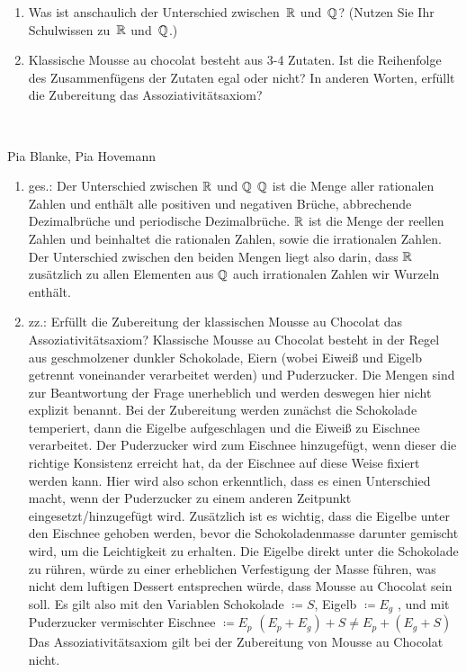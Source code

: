 \bigskip


\begin{aufg}[4 Punkte]
\begin{enumerate}[label=$\mathrm{(\roman*)}$, ref=$\mathrm{\roman*}$]
\item Was ist anschaulich der Unterschied zwischen~$\mathbb{R}$ und~$\mathbb{Q}$? (Nutzen Sie Ihr Schulwissen zu~$\mathbb{R}$ und~$\mathbb{Q}$.)
\item Klassische Mousse au chocolat besteht aus 3-4 Zutaten. Ist die Reihenfolge des Zusammenf\"ugens der Zutaten egal oder nicht? In anderen Worten, erf\"ullt die Zubereitung das Assoziativit\"atsaxiom?
\end{enumerate}
\end{aufg}
 
\bigskip

\begin{lsg}\mbox{ }
\item [Pia Blanke, Pia Hovemann]
\begin{enumerate}[label=$\mathrm{(\roman*)}$, ref=$\mathrm{\roman*}$]
\item ges.: Der Unterschied zwischen $\mathbb{R}$ und $\mathbb{Q}$ 
$\mathbb{Q}$  ist die Menge aller rationalen Zahlen und enth\"alt alle positiven und negativen Br\"uche, abbrechende Dezimalbr\"uche und periodische Dezimalbr\"uche.
$\mathbb{R}$ ist die Menge der reellen Zahlen und beinhaltet die rationalen Zahlen, sowie die irrationalen Zahlen.
Der Unterschied zwischen den beiden Mengen liegt also darin, dass $\mathbb{R}$ zus\"atzlich zu allen Elementen aus $\mathbb{Q}$  auch irrationalen Zahlen wir Wurzeln enth\"alt.
%
\item zz.: Erf\"ullt die Zubereitung der klassischen Mousse au Chocolat das Assoziativit\"atsaxiom?
Klassische Mousse au Chocolat besteht in der Regel aus geschmolzener dunkler Schokolade, Eiern (wobei Eiwei{\ss} und Eigelb getrennt voneinander verarbeitet werden) und Puderzucker. Die Mengen sind zur Beantwortung der Frage unerheblich und werden deswegen hier nicht explizit benannt.
Bei der Zubereitung werden zun\"achst die Schokolade temperiert, dann die Eigelbe aufgeschlagen und die Eiwei{\ss} zu Eischnee verarbeitet. Der Puderzucker wird zum Eischnee hinzugef\"ugt, wenn dieser die richtige Konsistenz erreicht hat, da der Eischnee auf diese Weise fixiert werden kann. Hier wird also schon erkenntlich, dass es einen Unterschied macht, wenn der Puderzucker zu einem anderen Zeitpunkt eingesetzt/hinzugef\"ugt wird. 
Zus\"atzlich ist es wichtig, dass die Eigelbe unter den Eischnee gehoben werden, bevor die Schokoladenmasse darunter gemischt wird, um die Leichtigkeit zu erhalten. Die Eigelbe direkt unter die Schokolade zu r\"uhren, w\"urde zu einer erheblichen Verfestigung der Masse f\"uhren, was nicht dem luftigen Dessert entsprechen w\"urde, dass Mousse au Chocolat sein soll.
Es gilt also mit den Variablen Schokolade $\coloneqq S$, Eigelb $\coloneqq E_{g}$ , und mit Puderzucker vermischter Eischnee $\coloneqq E_{p}$
$(E_{p} + E_{g}) + S \neq E_{p} + (E_{g} + S)$
Das Assoziativit\"atsaxiom gilt bei der Zubereitung von Mousse au Chocolat nicht.
\end{enumerate}
\end{lsg}
